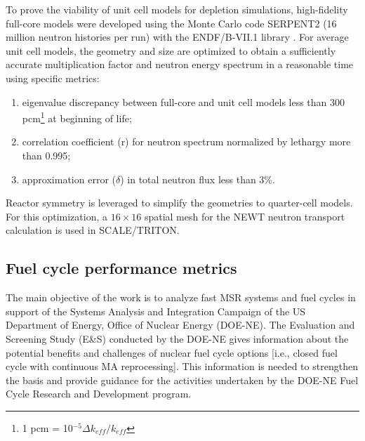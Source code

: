 \documentclass[letterpaper]{mandc2019}
\begin{document}
To prove the viability of unit cell models for depletion simulations, high-fidelity full-core models were developed using the Monte Carlo code SERPENT2 (16 million neutron histories per run) with the ENDF/B-VII.1 library \cite{leppanen_serpent_2015, chadwick_endf/b-vii.1_2011}. For average unit cell models, the geometry and size are optimized to obtain a sufficiently accurate multiplication factor and neutron energy spectrum in a reasonable time using specific metrics:
\vspace{-0.08in}
\begin{enumerate}
	\item eigenvalue discrepancy between full-core and unit cell models less than 300 pcm\footnote{ 1 pcm = 10$^{-5}\Delta k_{eff}/k_{eff}$} at beginning of life;\vspace{-0.11in}
	\item correlation coefficient (r) for neutron spectrum normalized by lethargy more than 0.995;\vspace{-0.11in}
	\item approximation error ($\delta$) in total neutron flux less than 3\%.\vspace{-0.08in}
\end{enumerate}
Reactor symmetry is leveraged to simplify the geometries to quarter-cell models. For this optimization, a $16\times 16$ spatial mesh for the NEWT neutron transport calculation is used in SCALE/TRITON.

\subsection{Fuel cycle performance metrics}
\label{sec:metrics}
The main objective of the work is to analyze fast \gls{MSR} systems and fuel cycles in support of the Systems Analysis and Integration Campaign of the US Department of Energy, Office of Nuclear Energy (DOE-NE). The Evaluation and Screening Study (E\&S) conducted by the DOE-NE gives information about the potential benefits and challenges of nuclear fuel cycle options [i.e., closed fuel cycle with continuous \gls{MA} reprocessing]. This information is needed to strengthen the basis and provide guidance for the activities undertaken by the DOE-NE Fuel Cycle Research and Development program.
\end{document}
